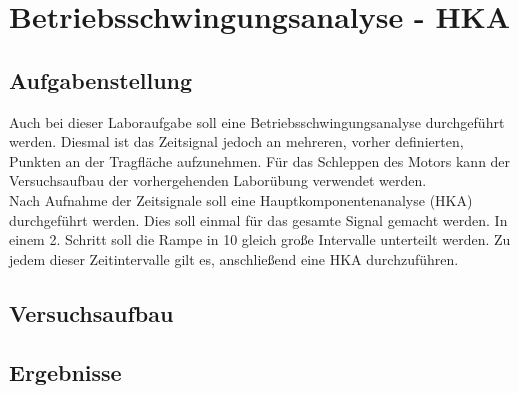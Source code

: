 \chapter{Betriebsschwingungsanalyse - HKA}
\label{sec: Hauptkapitel 3}

\section{Aufgabenstellung}
    Auch bei dieser Laboraufgabe soll eine Betriebsschwingungsanalyse
    durchgeführt werden. Diesmal ist das Zeitsignal jedoch an mehreren, vorher
    definierten, Punkten an der Tragfläche aufzunehmen. Für das Schleppen des
    Motors kann der Versuchsaufbau der vorhergehenden Laborübung verwendet
    werden.
    \\

    \noindent
    Nach Aufnahme der Zeitsignale soll eine Hauptkomponentenanalyse (HKA)
    durchgeführt werden. Dies soll einmal für das gesamte Signal gemacht werden.
    In einem 2. Schritt soll die Rampe in 10 gleich große Intervalle unterteilt
    werden. Zu jedem dieser Zeitintervalle gilt es, anschließend eine HKA
    durchzuführen.

\section{Versuchsaufbau}

\section{Ergebnisse}